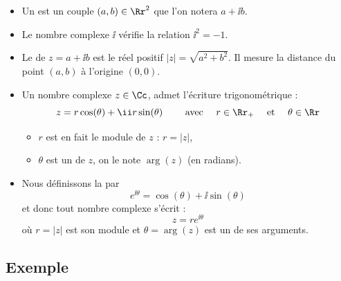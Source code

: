 \documentclass[11pt,class=report,crop=false]{standalone}
\begin{document}
\begin{itemize}
	\item Un  est un couple $(a, b) \in \Rr^2$ que l'on notera $a + \ii b$. 
    
    \item Le nombre complexe $\ii$ vérifie la relation $\ii ^2 = - 1$.


    \item Le  de $z = a + \ii b$ est le réel positif $|z| = \sqrt{a^2 + b^2}$. Il mesure la distance du point $(a,b)$ à l'origine $(0,0)$.
    
    \item 
    Un nombre complexe $z\in\Cc$, admet l'écriture trigonométrique :
    $$z = r\cos(\theta)  + \ii r\sin(\theta) \qquad
    	\text{ avec } \quad r \in\Rr_+ \quad \text{ et } \quad \theta \in \Rr$$
    
    
    \begin{itemize}
    	\item $r$ est en fait le module de $z$ : $r=|z|$,
    	\item $\theta$ est un  de $z$, on le note $\arg(z)$ (en radians).
    \end{itemize}

   \item Nous définissons la  par
   $$e^{\ii  \theta} = \cos(\theta) + \ii  \sin(\theta)$$
   et donc tout nombre complexe s'écrit :
   $$z = r e^{\ii  \theta}$$
   o\`u $r = \left| z \right|$ est son module et $\theta = \arg (z)$ est un de ses arguments.
   
\end{itemize}

\subsection{Exemple}
\end{document}
